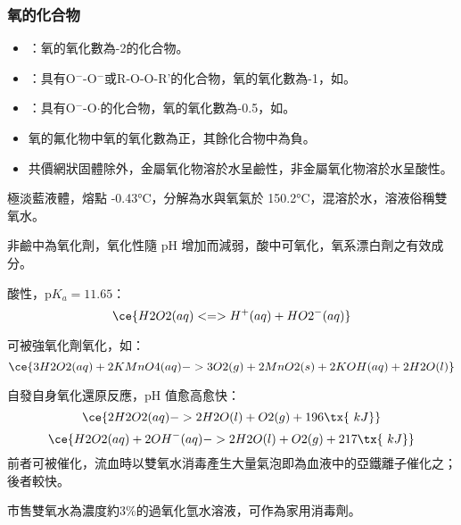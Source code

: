 \documentclass[a4paper,12pt]{report}
\begin{document}
\subsubsection{氧的化合物}
\begin{itemize}
\item {}：氧的氧化數為-2的化合物。
\item {}：具有O$^-$-O$^-$或R-O-O-R'的化合物，氧的氧化數為-1，如。
\item {}：具有O$^-$-O$\cdot$的化合物，氧的氧化數為-0.5，如。
\item 氧的氟化物中氧的氧化數為正，其餘化合物中為負。
\item 共價網狀固體除外，金屬氧化物溶於水呈鹼性，非金屬氧化物溶於水呈酸性。
\end{itemize}
\bit
\item 極淡藍液體，熔點 -0.43°C，分解為水與氧氣於 150.2°C，混溶於水，溶液俗稱雙氧水。
\item 非鹼中為氧化劑，氧化性隨 pH 增加而減弱，酸中可氧化，氧系漂白劑之有效成分。
\item 酸性，p$K_a=11.65$：
\[\ce{H2O2(aq) <=> H^+(aq) + HO2^-(aq)}\]
\item 可被強氧化劑氧化，如：
\[\ce{3H2O2(aq) + 2KMnO4(aq) -> 3O2(g) + 2MnO2(s) + 2KOH(aq) + 2H2O(l)}\]
\item 自發自身氧化還原反應，pH 值愈高愈快：
\[\ce{2H2O2(aq) -> 2H2O(l) + O2(g) + 196\tx{\ kJ}}\]
\[\ce{H2O2(aq) + 2OH^-(aq) -> 2H2O(l) + O2(g) + 217\tx{\ kJ}}\]
前者可被催化，流血時以雙氧水消毒產生大量氣泡即為血液中的亞鐵離子催化之；後者較快。
\item 市售雙氧水為濃度約3\%的過氧化氫水溶液，可作為家用消毒劑。
\eit
{}
\end{document}

